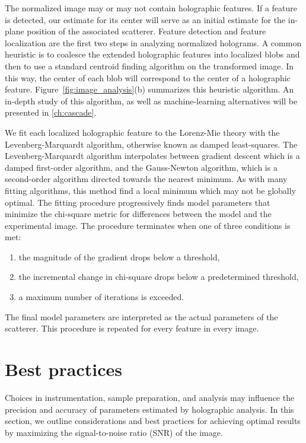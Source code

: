The normalized image may or may not contain holographic features. If a feature
is detected,
our estimate for its center will serve as an initial estimate
for the in-plane position of the associated scatterer.
Feature detection and feature localization are the first two steps in analyzing
normalized holograms. A common heuristic is to coalesce the
extended holographic features into localized blobs and then to use a standard
centroid finding algorithm\cite{crocker96} on the transformed image. In this way,
the center of each blob will correspond to the center of a holographic feature.
Figure~\ref{fig:image_analysis}(b)
summarizes this heuristic algorithm. An in-depth study of this algorithm, as well
as machine-learning alternatives will be presented in \autoref{ch:cascade}.

We fit each localized holographic feature to the Lorenz-Mie theory
with the Levenberg-Marquardt algorithm, otherwise known as damped least-squares.
The Levenberg-Marquardt algorithm interpolates between gradient descent which is a damped
first-order algorithm, and the Gauss-Newton algorithm, which is a second-order
algorithm directed towards the nearest minimum. As with many fitting algorithms,
this method find a local minimum which may not be globally optimal. The fitting
procedure progressively finds model parameters that minimize the
chi-square metric for differences between the model and the experimental image.
The procedure terminates when one of three conditions is met:
\begin{enumerate}
\item the magnitude of the gradient drops below a threshold,
\item the incremental change in chi-square drops below a predetermined threshold,
\item a maximum number of iterations is exceeded.
\end{enumerate}
The final model parameters are interpreted as the actual parameters of the
scatterer. This procedure is repeated for every feature in every image.

\section{Best practices}

Choices in instrumentation, sample preparation, and analysis may influence
the precision and accuracy of parameters estimated by holographic
analysis. In this section, we outline considerations
and best practices for achieving optimal results by maximizing the
signal-to-noise ratio (SNR) of the image. 


